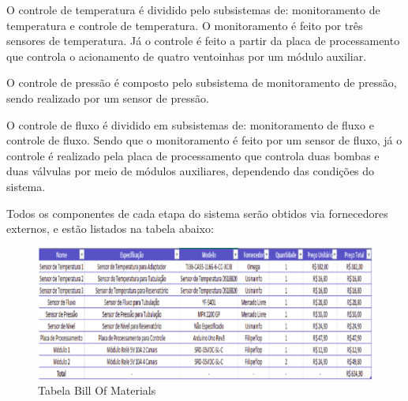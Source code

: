 O controle de temperatura é dividido pelo subsistemas de: monitoramento de temperatura e controle de temperatura. O monitoramento é feito por três sensores de temperatura. Já o controle é feito a partir da placa de processamento que controla o acionamento de quatro ventoinhas por um módulo auxiliar.

O controle de pressão é composto pelo subsistema de monitoramento de pressão, sendo realizado por um sensor de pressão.

O controle de fluxo é dividido em subsistemas de: monitoramento de fluxo e controle de fluxo. Sendo que o monitoramento é feito por um sensor de fluxo, já o controle é realizado pela placa de processamento que controla duas bombas e duas válvulas por meio de módulos auxiliares, dependendo das condições do sistema.

Todos os componentes de cada etapa do sistema serão obtidos via fornecedores externos, e estão listados na tabela abaixo:

\begin{figure}[ht]                                          
    \includegraphics[scale=0.7]{figuras/bom1.eps}
    \caption{ Tabela Bill Of Materials }   \label{figbom1}              
\end{figure} 
